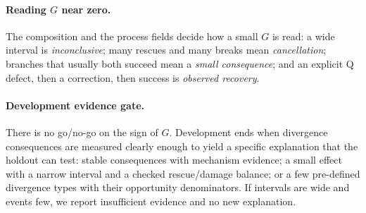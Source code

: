 \paragraph{Reading $G$ near zero.} The composition and the process fields decide how a small $G$ is read: a wide interval is \emph{inconclusive}; many rescues and many breaks mean \emph{cancellation}; branches that usually both succeed mean a \emph{small consequence}; and an explicit Q defect, then a correction, then success is \emph{observed recovery}.

\begin{table}[t]
\centering\scriptsize\setlength{\tabcolsep}{3pt}
\caption{Process evidence for development fork states. ``Recovered'' requires defect $\rightarrow$ correction $\rightarrow$ requirements satisfied. }
\label{tab:mech}
\end{table}

\paragraph{Development evidence gate.} There is no go/no-go on the sign of $G$. Development ends when divergence consequences are measured clearly enough to yield a specific explanation that the holdout can test: stable consequences with mechanism evidence; a small effect with a narrow interval and a checked rescue/damage balance; or a few pre-defined divergence types with their opportunity denominators. If intervals are wide and events few, we report insufficient evidence and no new explanation. 
